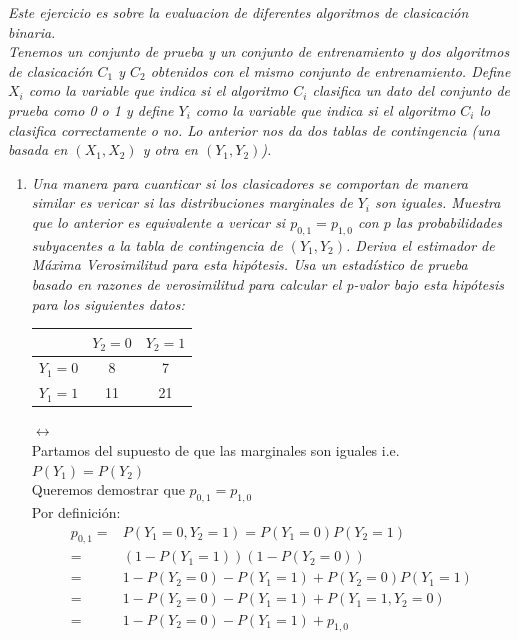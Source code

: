 \documentclass[paper=letter, fontsize=11pt]{scrartcl}
\numberwithin{equation}{section} %
\numberwithin{figure}{section} %
\numberwithin{table}{section} %
\begin{document}
\textit{Este ejercicio es sobre la evaluacion de diferentes algoritmos de clasicación binaria.}\\
\textit{Tenemos un conjunto de prueba y un conjunto de entrenamiento y dos algoritmos de clasicación $C_1$ y $C_2$ obtenidos con el mismo conjunto de entrenamiento. Define $X_i$ como la variable que indica si el algoritmo $C_i$ clasifica un dato del conjunto de prueba como 0 o 1 y define $Y_i$ como la variable que indica si el algoritmo $C_i$ lo clasifica correctamente o no. Lo anterior nos da dos tablas de contingencia (una basada en $(X_1,X_2)$ y otra en $(Y_1, Y_2)$).}\\
\begin{enumerate}
\item \textit{Una manera para cuanticar si los clasicadores se comportan de manera similar es vericar si las distribuciones marginales de $Y_i$ son iguales. Muestra que lo anterior es equivalente a vericar si $p_{0,1} = p_{1,0}$ con $p$ las probabilidades subyacentes a la tabla de contingencia de $(Y_1, Y_2)$. Deriva el estimador de Máxima Verosimilitud para esta hipótesis. Usa un estadístico de prueba basado en razones de verosimilitud para calcular el p-valor bajo esta hipótesis para los siguientes datos:}\\
\begin{table}[h]
\begin{center}
\begin{tabular}{c|cc}
\hline
    & $Y_2=0$ & $Y_2=1$\\\hline
$Y_1=0$ & 8& 7\\
$Y_1=1$ & 11 & 21\\\hline
\end{tabular}
\end{center}
\end{table}
\FloatBarrier
$ \longleftrightarrow $\\
Partamos del supuesto de que las marginales son iguales i.e. $P(Y_1)=P(Y_2)$\\
Queremos demostrar que $p_{0,1} = p_{1,0}$\\
Por definición:
\begin{equation}
\begin{split}
p_{0,1}=&P(Y_1=0,Y_2=1)=P(Y_1=0)P(Y_2=1)\\
      =&  (1- P(Y_1=1))(1- P(Y_2=0))\\
      =& 1-P(Y_2=0)-P(Y_1=1)+P(Y_2=0)P(Y_1=1)\\
      =& 1-P(Y_2=0)-P(Y_1=1) +P(Y_1=1,Y_2=0)\\
            =& 1-P(Y_2=0)-P(Y_1=1) +p_{1,0}\\

\end{split}
\end{equation}
\end{enumerate}
\end{document}
